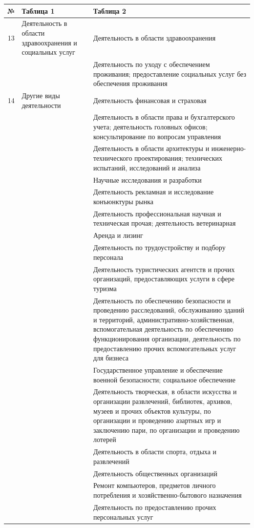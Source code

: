 \documentclass[12pt, a4paper]{article}
\begin{document}
\begin{tabular}[t]{|c|p{6cm}|p{9cm}|}
\hline
	№ & Таблица 1 & Таблица 2\\
\hline
13 & Деятельность в области здравоохранения и социальных услуг & Деятельность в области здравоохранения \\ \cline{3-3}
&& Деятельность по уходу с обеспечением проживания; предоставление социальных услуг без обеспечения проживания \\ \cline{1-3}
14 & Другие виды деятельности & Деятельность финансовая и страховая\\ \cline{3-3}
&& Деятельность в области права и бухгалтерского учета; деятельность головных офисов; консультирование по вопросам управления \\ \cline{3-3}
&& Деятельность в области архитектуры и инженерно-технического проектирования; технических испытаний, исследований и анализа \\ \cline{3-3}
&&Научные исследования и разработки \\ \cline{3-3}
&& Деятельность рекламная и исследование конъюнктуры рынка \\ \cline{3-3}
&& Деятельность профессиональная научная и техническая прочая; деятельность ветеринарная  \\ \cline{3-3}
&& Аренда и лизинг \\ \cline{3-3}
&& Деятельность по трудоустройству и подбору персонала \\ \cline{3-3}
&& Деятельность туристических агентств и прочих организаций, предоставляющих услуги в сфере туризма \\ \cline{3-3}
&& Деятельность по обеспечению безопасности и  проведению расследований, обслуживанию зданий и территорий, административно-хозяйственная, вспомогательная деятельность по обеспечению функционирования организации, деятельность по предоставлению прочих вспомогательных услуг для бизнеса \\ \cline{3-3}
&& Государственное управление и обеспечение военной безопасности; социальное обеспечение \\ \cline{3-3}
&& Деятельность творческая, в области искусства и организации развлечений, библиотек, архивов, музеев и прочих объектов культуры, по организации и проведению азартных игр и заключению пари, по организации и проведению лотерей \\ \cline{3-3}
&& Деятельность в области спорта, отдыха и развлечений \\ \cline{3-3}
&& Деятельность общественных организаций \\ \cline{3-3}
&& Ремонт компьютеров, предметов личного потребления и хозяйственно-бытового назначения \\ \cline{3-3}
&& Деятельность по предоставлению прочих персональных услуг \\ \cline{1-3}

\end{tabular}
\end{document}
